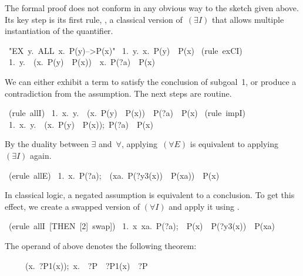 The formal proof does not conform in any obvious way to the sketch given
above.  Its key step is its first rule, , a classical
version of~$(\exists I)$ that allows multiple instantiation of the
quantifier.
\begin{isabelle}
\ "EX\ y.\ ALL\ x.\ P(y)-->P(x)"\isanewline
\ 1.\ \isasymexists y.\ \isasymforall x.\ P(y)\ \isasymlongrightarrow \ P(x)
\isanewline
{}\ (rule\ exCI)\isanewline
\ 1.\ \isasymforall y.\ \isasymnot \ (\isasymforall x.\ P(y)\ \isasymlongrightarrow \ P(x))\ \isasymLongrightarrow \ \isasymforall x.\ P(?a)\ \isasymlongrightarrow \ P(x)
\end{isabelle}
We can either exhibit a term  to satisfy the conclusion of
subgoal~1, or produce a contradiction from the assumption.  The next
steps are routine.
\begin{isabelle}
\ (rule\ allI)\isanewline
\ 1.\ \isasymAnd x.\ \isasymforall y.\ \isasymnot \ (\isasymforall x.\ P(y)\ \isasymlongrightarrow \ P(x))\ \isasymLongrightarrow \ P(?a)\ \isasymlongrightarrow \ P(x)
\isanewline
{}\ (rule\ impI)\isanewline
\ 1.\ \isasymAnd x.\ \isasymlbrakk \isasymforall y.\ \isasymnot \ (\isasymforall x.\ P(y)\ \isasymlongrightarrow \ P(x));\ P(?a)\isasymrbrakk \ \isasymLongrightarrow \ P(x)
\end{isabelle}
By the duality between $\exists$ and~$\forall$, applying~$(\forall E)$
is equivalent to applying~$(\exists I)$ again.
\begin{isabelle}
\ (erule\ allE)\isanewline
\ 1.\ \isasymAnd x.\ \isasymlbrakk P(?a);\ \isasymnot \ (\isasymforall xa.\ P(?y3(x))\ \isasymlongrightarrow \ P(xa))\isasymrbrakk \ \isasymLongrightarrow \ P(x)
\end{isabelle}
In classical logic, a negated assumption is equivalent to a conclusion.  To
get this effect, we create a swapped version of $(\forall I)$ and apply it
using .
\begin{isabelle}
\ (erule\ allI\ [THEN\ [2]\ swap])\isanewline
\ 1.\ \isasymAnd x\ xa.\ \isasymlbrakk P(?a);\ \isasymnot \ P(x)\isasymrbrakk \ \isasymLongrightarrow \ P(?y3(x))\ \isasymlongrightarrow \ P(xa)
\end{isabelle}
The operand of  above denotes the following theorem:
\begin{isabelle}
\ \ \ \ \isasymlbrakk \isasymnot \ (\isasymforall x.\ ?P1(x));\
\isasymAnd x.\ \isasymnot \ ?P\ \isasymLongrightarrow \
?P1(x)\isasymrbrakk \
\isasymLongrightarrow \ ?P%
\end{isabelle}

